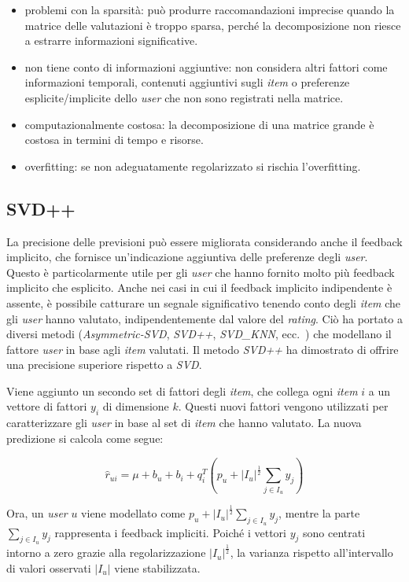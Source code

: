 \begin{itemize}
    \item problemi con la sparsità: può produrre raccomandazioni imprecise quando la matrice delle valutazioni è troppo sparsa, perché la decomposizione non riesce a estrarre informazioni significative. 
    \item non tiene conto di informazioni aggiuntive: non considera altri fattori come informazioni temporali, contenuti aggiuntivi sugli \textit{item} o preferenze esplicite/implicite dello \textit{user} che non sono registrati nella matrice.
    \item computazionalmente costosa: la decomposizione di una matrice grande è costosa in termini di tempo e risorse.
    \item overfitting: se non adeguatamente regolarizzato si rischia l'overfitting.
\end{itemize}

\subsection{SVD\protect++}

La precisione delle previsioni può essere migliorata considerando anche il feedback implicito, che fornisce un'indicazione aggiuntiva delle preferenze degli \textit{user}. Questo è particolarmente utile per gli \textit{user} che hanno fornito molto più feedback implicito che esplicito. Anche nei casi in cui il feedback implicito indipendente è assente, è possibile catturare un segnale significativo tenendo conto degli \textit{item} che gli \textit{user} hanno valutato, indipendentemente dal valore del \textit{rating}. Ciò ha portato a diversi metodi (\textit{Asymmetric-SVD}, \textit{SVD++}, \textit{SVD\_KNN}, ecc.~\cite{SVD++, SVD_KNN}) che modellano il fattore \textit{user} in base agli \textit{item} valutati. Il metodo \textit{SVD++} ha dimostrato di offrire una precisione superiore rispetto a \textit{SVD}.

Viene aggiunto un secondo set di fattori degli \textit{item}, che collega ogni \textit{item} $i$ a un vettore di fattori $y_i$ di dimensione $k$. Questi nuovi fattori vengono utilizzati per caratterizzare gli \textit{user} in base al set di \textit{item} che hanno valutato. La nuova predizione si calcola come segue:

\[
\hat{r}_{ui} = \mu + b_u + b_i + q_i^T \left(p_u + |I_u|^{\frac{1}{2}} \sum\limits_{j \in I_u} y_j \right)
\]

Ora, un \textit{user} $u$ viene modellato come $p_u + |I_u|^{\frac{1}{2}} \sum\limits_{j \in I_u} y_j$, mentre la parte $\sum\limits_{j \in I_u} y_j$ rappresenta i feedback impliciti. Poiché i vettori $y_j$ sono centrati intorno a zero grazie alla regolarizzazione $|I_u|^{\frac{1}{2}}$, la varianza rispetto all'intervallo di valori osservati $|I_u|$ viene stabilizzata.


